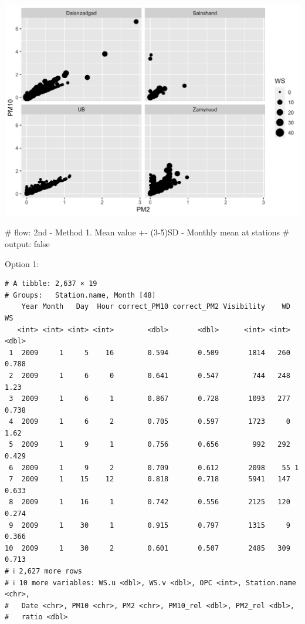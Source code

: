 \documentclass[
]{agujournal2019}
\begin{document}
\includegraphics{index_files/figure-latex/notebooks-01_datawork-cell-11-output-3.png}

\#\textbar{} flow: 2nd - Method 1. Mean value +- (3-5)SD - Monthly mean
at stations \#\textbar{} output: false

Option 1:

\begin{verbatim}
# A tibble: 2,637 × 19
# Groups:   Station.name, Month [48]
    Year Month   Day  Hour correct_PM10 correct_PM2 Visibility    WD    WS
   <int> <int> <int> <int>        <dbl>       <dbl>      <int> <int> <dbl>
 1  2009     1     5    16        0.594       0.509       1814   260 0.788
 2  2009     1     6     0        0.641       0.547        744   248 1.23 
 3  2009     1     6     1        0.867       0.728       1093   277 0.738
 4  2009     1     6     2        0.705       0.597       1723     0 1.62 
 5  2009     1     9     1        0.756       0.656        992   292 0.429
 6  2009     1     9     2        0.709       0.612       2098    55 1    
 7  2009     1    15    12        0.818       0.718       5941   147 0.633
 8  2009     1    16     1        0.742       0.556       2125   120 0.274
 9  2009     1    30     1        0.915       0.797       1315     9 0.366
10  2009     1    30     2        0.601       0.507       2485   309 0.713
# ℹ 2,627 more rows
# ℹ 10 more variables: WS.u <dbl>, WS.v <dbl>, OPC <int>, Station.name <chr>,
#   Date <chr>, PM10 <chr>, PM2 <chr>, PM10_rel <dbl>, PM2_rel <dbl>,
#   ratio <dbl>
\end{verbatim}
\end{document}

